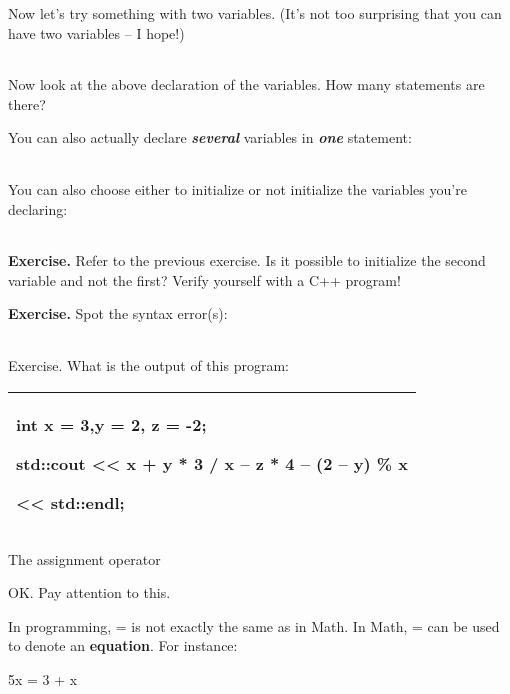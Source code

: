 \documentclass[
]{article}
\begin{document}
Now let's try something with two variables. (It's not too surprising
that you can have two variables -- I hope!)

\begin{longtable}[]{@{}@{}}
\toprule
\endhead
\bottomrule
\end{longtable}

Now look at the above declaration of the variables. How many statements
are there?

You can also actually declare \emph{\textbf{several}} variables in
\emph{\textbf{one}} statement:

\begin{longtable}[]{@{}@{}}
\toprule
\endhead
\bottomrule
\end{longtable}

You can also choose either to initialize or not initialize the variables
you're declaring:

\begin{longtable}[]{@{}@{}}
\toprule
\endhead
\bottomrule
\end{longtable}

\textbf{Exercise.} Refer to the previous exercise. Is it possible to
initialize the second variable and not the first? Verify yourself with a
C++ program!

\textbf{Exercise.} Spot the syntax error(s):

\begin{longtable}[]{@{}@{}}
\toprule
\endhead
\bottomrule
\end{longtable}

Exercise. What is the output of this program:

\begin{longtable}[]{@{}l@{}}
\toprule
\endhead
\begin{minipage}[t]{0.97\columnwidth}\raggedright
int x = 3,y = 2, z = -2;

std::cout \textless\textless{} x + y * 3 / x -- z * 4 -- (2 -- y) \% x

\textless\textless{} std::endl;\strut
\end{minipage}\tabularnewline
\bottomrule
\end{longtable}

The assignment operator

OK. Pay attention to this.

In programming, = is not exactly the same as in Math. In Math, = can be
used to denote an \textbf{equation}. For instance:

5x = 3 + x
\end{document}
